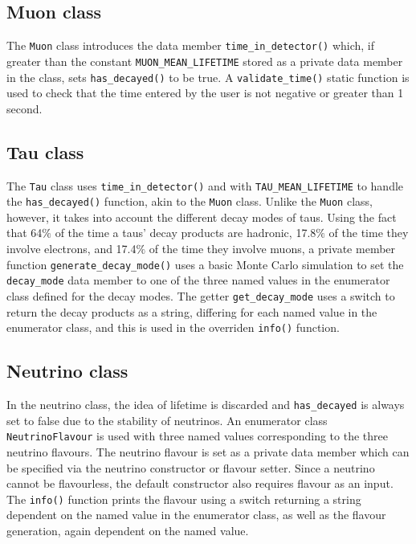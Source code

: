 \documentclass[11pt, letterpaper]{article}
\begin{document}
\subsection{Muon class}
The \verb|Muon| class introduces the data member \verb|time_in_detector()| which, if greater than the constant \verb|MUON_MEAN_LIFETIME| stored as a private data member in the class, sets \verb|has_decayed()| to be true. A \verb|validate_time()| static function is used to check that the time entered by the user is not negative or greater than 1 second.

\subsection{Tau class}
The \verb|Tau| class  uses \verb|time_in_detector()| and with \verb|TAU_MEAN_LIFETIME| to handle the \verb|has_decayed()| function, akin to the \verb|Muon| class. Unlike the \verb|Muon| class, however, it takes into account the different decay modes of taus. Using the fact that 64$\%$ of the time a taus' decay products are hadronic, 17.8$\%$ of the time they involve electrons, and 17.4$\%$ of the time they involve muons, a private member function \verb|generate_decay_mode()| uses a basic Monte Carlo simulation to set the \verb|decay_mode| data member to one of the three named values in the enumerator class defined for the decay modes. The getter \verb|get_decay_mode| uses a switch to return the decay products as a string, differing for each named value in the enumerator class, and this is used in the overriden \verb|info()| function.

\subsection{Neutrino class}
In the neutrino class, the idea of lifetime is discarded and \verb|has_decayed| is always set to false due to the stability of neutrinos. An enumerator class \verb|NeutrinoFlavour| is used with three named values corresponding to the three neutrino flavours. The neutrino flavour is set as a private data member which can be specified via the neutrino constructor or flavour setter. Since a neutrino cannot be flavourless, the default constructor also requires flavour as an input. The \verb|info()| function prints the flavour using a switch returning a string dependent on the named value in the enumerator class, as well as the flavour generation, again dependent on the named value.
\end{document}
